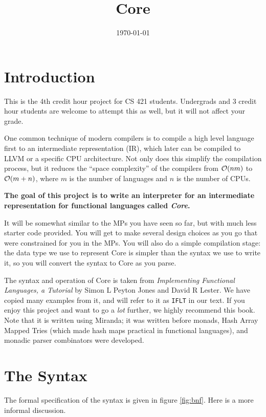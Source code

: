 \documentclass[11pt]{article}
\date{\today}
\title{Core}
\begin{document}
\maketitle
\tableofcontents

\section{Introduction}
\label{sec:org269edae}

This is the 4th credit hour project for CS 421 students.  Undergrads and 3 credit hour students are welcome
to attempt this as well, but it will not affect your grade.

One common technique of modern compilers is to compile a high level language first to an intermediate representation (IR),
which later can be compiled to LLVM or a specific CPU architecture.  Not only does this simplify the compilation process,
but it reduces the ``space complexity'' of the compilers from \({\cal O}(nm)\) to \({\cal O}(m + n)\), where \(m\) is the
number of languages and \(n\) is the number of CPUs.

\textbf{The goal of this project is to write an interpreter for an intermediate representation for functional languages called \emph{Core}.}

It will be somewhat similar to the MPs you have seen so far, but with much less starter code provided.  You will get to make several
design choices as you go that were constrained for you in the MPs.  You will also do a simple compilation stage: the data type we use
to represent Core is simpler than the syntax we use to write it, so you will convert the syntax to Core as you parse.

The syntax and operation of Core is taken from \emph{Implementing Functional Languages, a Tutorial} by Simon L Peyton Jones
and David R Lester.  We have copied many examples from it, and will refer to it as \texttt{IFLT} in our text.  If you enjoy
this project and want to go a \emph{lot} further, we highly recommend this book.  Note that it is written using Miranda; it
was written before monads, Hash Array Mapped Tries (which made hash maps practical in functional languages), and monadic
parser combinators were developed.
\section{The Syntax}
\label{sec:orgf4e9992}

The formal specification of the syntax is given in figure \ref{fig:bnf}.  Here is a more informal discussion.
\end{document}
